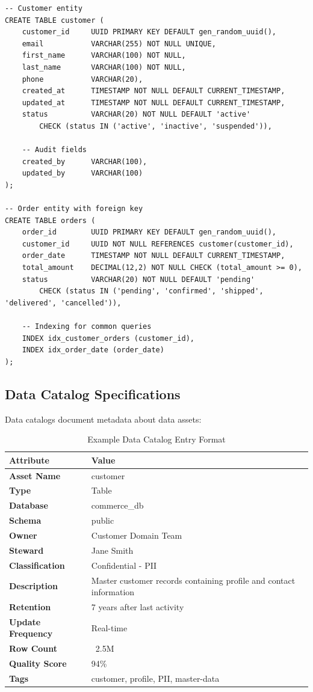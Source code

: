 \documentclass[11pt,letterpaper]{article}
\begin{document}
\begin{verbatim}
-- Customer entity
CREATE TABLE customer (
    customer_id     UUID PRIMARY KEY DEFAULT gen_random_uuid(),
    email           VARCHAR(255) NOT NULL UNIQUE,
    first_name      VARCHAR(100) NOT NULL,
    last_name       VARCHAR(100) NOT NULL,
    phone           VARCHAR(20),
    created_at      TIMESTAMP NOT NULL DEFAULT CURRENT_TIMESTAMP,
    updated_at      TIMESTAMP NOT NULL DEFAULT CURRENT_TIMESTAMP,
    status          VARCHAR(20) NOT NULL DEFAULT 'active'
        CHECK (status IN ('active', 'inactive', 'suspended')),
    
    -- Audit fields
    created_by      VARCHAR(100),
    updated_by      VARCHAR(100)
);

-- Order entity with foreign key
CREATE TABLE orders (
    order_id        UUID PRIMARY KEY DEFAULT gen_random_uuid(),
    customer_id     UUID NOT NULL REFERENCES customer(customer_id),
    order_date      TIMESTAMP NOT NULL DEFAULT CURRENT_TIMESTAMP,
    total_amount    DECIMAL(12,2) NOT NULL CHECK (total_amount >= 0),
    status          VARCHAR(20) NOT NULL DEFAULT 'pending'
        CHECK (status IN ('pending', 'confirmed', 'shipped', 'delivered', 'cancelled')),
    
    -- Indexing for common queries
    INDEX idx_customer_orders (customer_id),
    INDEX idx_order_date (order_date)
);
\end{verbatim}

\subsection{Data Catalog Specifications}

Data catalogs document metadata about data assets:

\begin{table}[H]
\centering
\caption{Example Data Catalog Entry Format}
\small
\begin{tabular}{@{}L{3cm}L{10.5cm}@{}}
\toprule
\textbf{Attribute} & \textbf{Value} \\
\midrule
\textbf{Asset Name} & customer \\
\textbf{Type} & Table \\
\textbf{Database} & commerce\_db \\
\textbf{Schema} & public \\
\textbf{Owner} & Customer Domain Team \\
\textbf{Steward} & Jane Smith \\
\textbf{Classification} & Confidential - PII \\
\textbf{Description} & Master customer records containing profile and contact information \\
\textbf{Retention} & 7 years after last activity \\
\textbf{Update Frequency} & Real-time \\
\textbf{Row Count} & ~2.5M \\
\textbf{Quality Score} & 94\% \\
\textbf{Tags} & customer, profile, PII, master-data \\
\bottomrule
\end{tabular}
\end{table}
\end{document}
